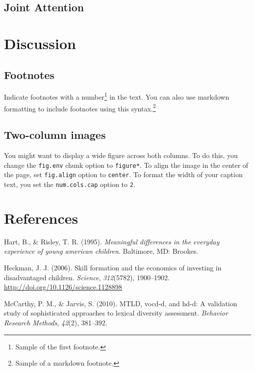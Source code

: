 \documentclass[10pt, letterpaper]{article}
\begin{document}
\subsection{Joint Attention}\label{joint-attention-1}

\section{Discussion}\label{discussion-1}

\subsection{Footnotes}\label{footnotes}

Indicate footnotes with a number\footnote{Sample of the first
footnote.} in the text. You can also use markdown formatting to include
footnotes using this syntax.\footnote{Sample of a markdown footnote.}

\subsection{Two-column images}\label{two-column-images}

You might want to display a wide figure across both columns. To do this,
you change the \texttt{fig.env} chunk option to \texttt{figure*}. To
align the image in the center of the page, set \texttt{fig.align} option
to \texttt{center}. To format the width of your caption text, you set
the \texttt{num.cols.cap} option to \texttt{2}.

\section{References}\label{references}

\setlength{\parindent}{-0.1in} \setlength{\leftskip}{0.125in} \noindent

\hypertarget{refs}{}
\hypertarget{ref-Hart1995}{}
Hart, B., \& Risley, T. R. (1995). \emph{Meaningful differences in the
everyday experience of young american children}. Baltimore, MD: Brookes.

\hypertarget{ref-Heckman2006}{}
Heckman, J. J. (2006). Skill formation and the economics of investing in
disadvantaged children. \emph{Science}, \emph{312}(5782), 1900--1902.
\url{http://doi.org/10.1126/science.1128898}

\hypertarget{ref-McCarthy2010}{}
McCarthy, P. M., \& Jarvis, S. (2010). MTLD, vocd-d, and hd-d: A
validation study of sophisticated approaches to lexical diversity
assessment. \emph{Behavior Research Methods}, \emph{42}(2), 381--392.
\end{document}
